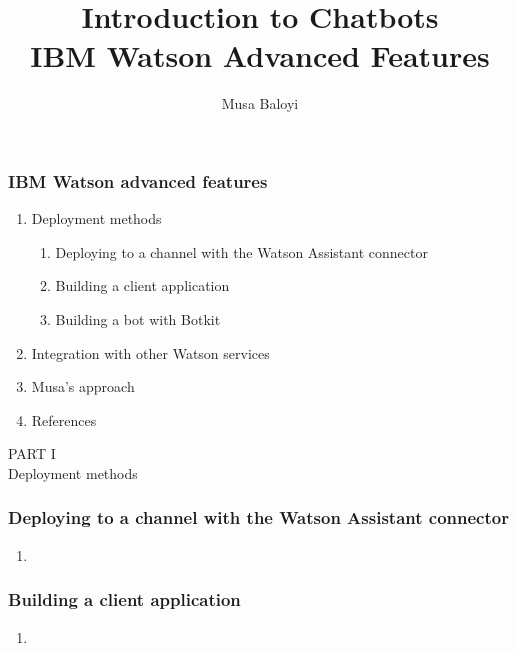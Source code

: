 \documentclass[11pt]{beamer}
\begin{document}
	\author{Musa Baloyi}
	\title{Introduction to Chatbots \\ IBM Watson Advanced Features} %
	\begin{frame}[plain]
	\maketitle
\end{frame}

\begin{frame}
	\frametitle{IBM Watson advanced features}
	\begin{enumerate}
		\item Deployment methods
		\begin{enumerate}
			\item Deploying to a channel with the Watson Assistant connector
			\item Building a client application
			\item Building a bot with Botkit
		\end{enumerate}
		\item Integration with other Watson services
		\item Musa's approach
		\item References
	\end{enumerate}
\end{frame}

\begin{frame}
\begin{center}
	PART I \\ Deployment methods 
\end{center}
\end{frame}

\begin{frame}
	\frametitle{Deploying to a channel with the Watson Assistant connector}
	\begin{enumerate}
		\item 
	\end{enumerate}
\end{frame}

\begin{frame}
	\frametitle{Building a client application}
	\begin{enumerate}
		\item 
	\end{enumerate}
\end{frame}
\end{document}
